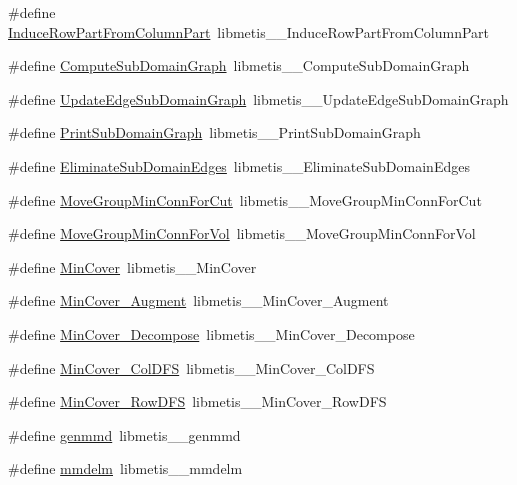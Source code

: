\begin{DoxyCompactItemize}
\item 
\#define \hyperlink{a00957_a6d383a9e842b0b2a2e7a1d7b9fe3260c}{Induce\+Row\+Part\+From\+Column\+Part}~libmetis\+\_\+\+\_\+\+Induce\+Row\+Part\+From\+Column\+Part
\item 
\#define \hyperlink{a00957_a176287772325404d5545ef12aede37a5}{Compute\+Sub\+Domain\+Graph}~libmetis\+\_\+\+\_\+\+Compute\+Sub\+Domain\+Graph
\item 
\#define \hyperlink{a00957_a4845bcda6fb7a37675310212a7f8a519}{Update\+Edge\+Sub\+Domain\+Graph}~libmetis\+\_\+\+\_\+\+Update\+Edge\+Sub\+Domain\+Graph
\item 
\#define \hyperlink{a00957_aba6642c7f9f2a54d7e1aba76fb4f88e5}{Print\+Sub\+Domain\+Graph}~libmetis\+\_\+\+\_\+\+Print\+Sub\+Domain\+Graph
\item 
\#define \hyperlink{a00957_a2f959416f3d0134cfea6a7f5405fddc6}{Eliminate\+Sub\+Domain\+Edges}~libmetis\+\_\+\+\_\+\+Eliminate\+Sub\+Domain\+Edges
\item 
\#define \hyperlink{a00957_aab6a2faa18fe852a9d63a4603717891c}{Move\+Group\+Min\+Conn\+For\+Cut}~libmetis\+\_\+\+\_\+\+Move\+Group\+Min\+Conn\+For\+Cut
\item 
\#define \hyperlink{a00957_ab23e8ce4e716287ecb1ea11ee117012b}{Move\+Group\+Min\+Conn\+For\+Vol}~libmetis\+\_\+\+\_\+\+Move\+Group\+Min\+Conn\+For\+Vol
\item 
\#define \hyperlink{a00957_a95c594610c16e79f833994ec5fe52f9f}{Min\+Cover}~libmetis\+\_\+\+\_\+\+Min\+Cover
\item 
\#define \hyperlink{a00957_ac553194effb2adfd83283f0d73f3b055}{Min\+Cover\+\_\+\+Augment}~libmetis\+\_\+\+\_\+\+Min\+Cover\+\_\+\+Augment
\item 
\#define \hyperlink{a00957_ab6a8507fb4e4544aaed29eecfe349571}{Min\+Cover\+\_\+\+Decompose}~libmetis\+\_\+\+\_\+\+Min\+Cover\+\_\+\+Decompose
\item 
\#define \hyperlink{a00957_a92bae96c343e5f576a4f6fea41d9dde6}{Min\+Cover\+\_\+\+Col\+D\+FS}~libmetis\+\_\+\+\_\+\+Min\+Cover\+\_\+\+Col\+D\+FS
\item 
\#define \hyperlink{a00957_a834e5ddce999c70cb39b9dcc107b8ca6}{Min\+Cover\+\_\+\+Row\+D\+FS}~libmetis\+\_\+\+\_\+\+Min\+Cover\+\_\+\+Row\+D\+FS
\item 
\#define \hyperlink{a00957_a99c683217a39fb863c7b9364907008da}{genmmd}~libmetis\+\_\+\+\_\+genmmd
\item 
\#define \hyperlink{a00957_ae9ce66d53f97c7576c03ea50cebaa52b}{mmdelm}~libmetis\+\_\+\+\_\+mmdelm
\item 

\end{DoxyCompactItemize}
